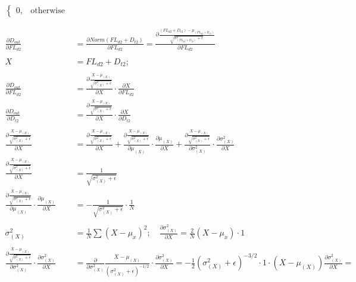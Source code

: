\documentclass[12pt,letterpaper]{article}
\begin{document}
\begin{align*}
\begin{cases}
        0, & \text{otherwise}
        \end{cases} 
\\\\\\
\frac{\partial D_{out}}{\partial FL_{d2}}&=\frac{\partial Norm(FL_{d2} + D_{t2})}{\partial FL_{d2}}=
\frac{\partial \frac{(FL_{d2} + D_{t2})-\mu_{(FL_{d2} + D_{t2})}}{\sqrt{\sigma^2_{(FL_{d2} + D_{t2})}+\epsilon}}}{\partial FL_{d2}}\\ \\
X&= FL_{d2} + D_{t2} ;\\ \\
\frac{\partial D_{out}}{\partial FL_{d2}}&=
\frac{\partial \frac{X-\mu_{(X)}}{\sqrt{\sigma^2_{(X)}+\epsilon}}}{\partial X}\cdot\frac{\partial X}{\partial FL_{d2}}\\
\frac{\partial D_{out}}{\partial D_{t2}}&=
\frac{\partial \frac{X-\mu_{(X)}}{\sqrt{\sigma^2_{(X)}+\epsilon}}}{\partial X}\cdot\frac{\partial X}{\partial D_{t2}}\\\\
\frac{\partial \frac{X-\mu_{(X)}}{\sqrt{\sigma^2_{(X)}+\epsilon}}}{\partial X} &=
\frac{\partial \frac{X-\mu_{(X)}}{\sqrt{\sigma^2_{(X)}+\epsilon}}}{\partial X}+
\frac{\partial \frac{X-\mu_{(X)}}{\sqrt{\sigma^2_{(X)}+\epsilon}}}{\partial \mu_{(X)}}\cdot \frac{\partial \mu_{(X)}}{\partial X}+
\frac{\partial \frac{X-\mu_{(X)}}{\sqrt{\sigma^2_{(X)}+\epsilon}}}{\partial \sigma^2_{(X)}}\cdot \frac{\partial \sigma^2_{(X)}}{\partial X}\\
\frac{\partial \frac{X-\mu_{(X)}}{\sqrt{\sigma^2_{(X)}+\epsilon}}}{\partial X} &=\frac{1}{\sqrt{\sigma^2_{(X)}+\epsilon}}\\
\frac{\partial \frac{X-\mu_{(X)}}{\sqrt{\sigma^2_{(X)}+\epsilon}}}{\partial \mu_{(X)}} \cdot \frac{\partial \mu_{(X)}}{\partial X } &=-\frac{1}{\sqrt{\sigma^2_{(X)}+\epsilon}}\cdot \frac{1}{N}\\\\
\sigma^2_{(X)}&=\frac{1}{N}\sum(X-\mu_{x})^2;\quad
\frac{\partial \sigma^2_{(X)}}{\partial X}=  \frac{2}{N}(X-\mu_{x})\cdot 1\\\\
\frac{\partial \frac{X-\mu_{(X)}}{\sqrt{\sigma^2_{(X)}+\epsilon}}}{\partial \sigma^2_{(X)}}\cdot \frac{\partial \sigma^2_{(X)}}{\partial X}&=
\frac{\partial}{\partial \sigma^2_{(X)}} \frac{X-\mu_{(X)}}{(\sigma^2_{(X)}+\epsilon)^{-1/2}}\cdot \frac{\partial \sigma^2_{(X)}}{\partial X}=
-\frac{1}{2}(\sigma^2_{(X)}+\epsilon)^{-3/2}\cdot 1 \cdot (X-\mu_{(X)})\frac{\partial \sigma^2_{(X)}}{\partial X}=

\end{align*}
\end{document}
